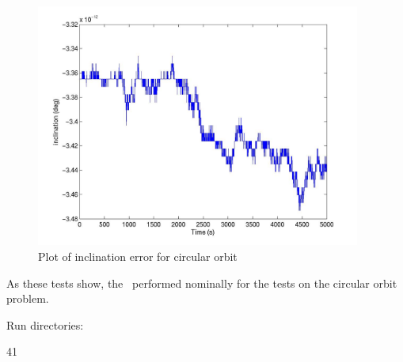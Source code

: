 \begin{description}
\begin{figure}[h]
\begin{center}
\includegraphics[height=80mm]{JPGfiles/circular_inc_err.jpg}
\caption{Plot of inclination error for circular orbit}
\label{circ_traj_inc_err}
\end{center}
\end{figure}

As these tests show, the \OrbitalElement\ performed nominally for the
tests on the circular orbit problem.

Run directories:

41
\end{description}

